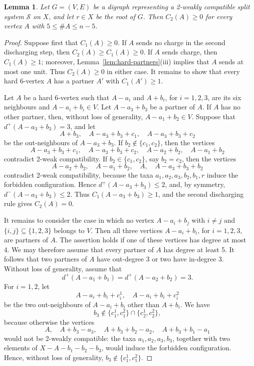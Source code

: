 \documentclass[11pt]{article}
\newtheorem{lemma}{Lemma}
\newcommand{\cS}{\mathcal{S}}
\begin{document}
	\begin{lemma}\label{lem:nonnegative-charge}
		Let $G=(V,E)$ be a digraph representing a 2-weakly compatible split system $\cS$ on $X$, and let $r\in X$ be the root of $G$. Then $C_2(A)\ge 0$ for every vertex $A$ with $5\le\#A\le n-5$.
	\end{lemma}
	
	\begin{proof}
		Suppose first that $C_1(A)\ge 0$. If $A$ sends no charge in the second discharging step, then $C_2(A)\ge C_1(A)\ge 0$. If $A$ sends charge, then $C_1(A)\ge 1$; moreover, Lemma~\ref{lem:hard-partners}(iii) implies that $A$ sends at most one unit. Thus $C_2(A)\ge 0$ in either case. It remains to show that every hard 6-vertex $A$ has a partner $A'$ with $C_1(A')\ge 1$.
		
		Let $A$ be a hard 6-vertex such that $A-a_i$ and $A+b_i$, for $i=1,2,3$, are its six neighbours and $A-a_i+b_i\in V$. Let $A-a_3+b_3$ be a partner of $A$. If $A$ has no other partner, then, without loss of generality, $A-a_1+b_2\in V$. Suppose that $d^+(A-a_3+b_3)=3$, and let
		\[
		A+b_3,\quad A-a_3+b_3+c_1,\quad A-a_3+b_3+c_2
		\]
		be the out-neighbours of $A-a_3+b_3$. If $b_2\notin\{c_1,c_2\}$, then the vertices
		\[
		A-a_3+b_3+c_1,\quad A-a_3+b_3+c_2,\quad A-a_2+b_2,\quad A-a_1+b_2
		\]
		contradict 2-weak compatibility. If $b_2\in\{c_1,c_2\}$, say $b_2=c_2$, then the vertices
		\[
		A-a_2+b_2,\quad A-a_1+b_2,\quad A,\quad A-a_3+b_3+b_2
		\]
		contradict 2-weak compatibility, because the taxa $a_1,a_2,a_3,b_2,b_1,r$ induce the forbidden configuration. Hence $d^+(A-a_3+b_3)\le 2$, and, by symmetry, $d^-(A-a_3+b_3)\le 2$. Thus $C_1(A-a_3+b_3)\ge 1$, and the second discharging rule gives $C_2(A)=0$.
		
		It remains to consider the case in which no vertex $A-a_i+b_j$ with $i\ne j$ and $\{i,j\}\subseteq\{1,2,3\}$ belongs to $V$. Then all three vertices $A-a_i+b_i$, for $i=1,2,3$, are partners of $A$. The assertion holds if one of these vertices has degree at most 4. We may therefore assume that every partner of $A$ has degree at least 5. It follows that two partners of $A$ have out-degree 3 or two have in-degree 3. Without loss of generality, assume that
		\[
		d^+(A-a_1+b_1)=d^+(A-a_2+b_2)=3.
		\]
		For $i=1,2$, let
		\[
		A-a_i+b_i+c_i^1,\quad A-a_i+b_i+c_i^2
		\]
		be the two out-neighbours of $A-a_i+b_i$ other than $A+b_i$. We have
		\[
		b_3\notin \{c_1^1,c_1^2\}\cap\{c_2^1,c_2^2\},
		\]
		because otherwise the vertices
		\[
		A,\quad A+b_3-a_3,\quad A+b_3+b_2-a_2,\quad A+b_3+b_1-a_1
		\]
		would not be 2-weakly compatible: the taxa $a_1,a_2,a_3,b_3$, together with two elements of $X-A-b_1-b_2-b_3$, would induce the forbidden configuration. Hence, without loss of generality, $b_3\notin\{c_1^1,c_1^2\}$.
		

\end{proof}
\end{document}
